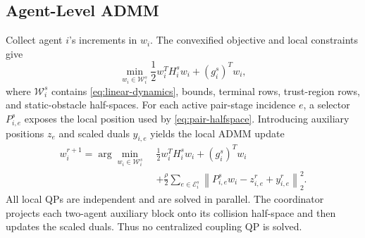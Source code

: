 \documentclass[letterpaper,10pt,conference]{ieeeconf}
\newcommand{\norm}[1]{\left\lVert #1\right\rVert}
\begin{document}
\subsection{Agent-Level ADMM}
Collect agent $i$'s increments in $w_i$. The convexified objective and local
constraints give
\begin{equation}
 \min_{w_i\in\mathcal W_i^s}\frac{1}{2}w_i^T H_i^s w_i
 +(g_i^s)^T w_i,
\end{equation}
where $\mathcal W_i^s$ contains \eqref{eq:linear-dynamics}, bounds, terminal
rows, trust-region rows, and static-obstacle half-spaces. For each active
pair-stage incidence $e$, a selector $P_{i,e}^s$ exposes the local position
used by \eqref{eq:pair-halfspace}. Introducing auxiliary positions $z_e$ and
scaled duals $y_{i,e}$ yields the local ADMM update
\begin{equation}
 \begin{aligned}
 w_i^{r+1}=\arg\min_{w_i\in\mathcal W_i^s}\;&
 \frac{1}{2}w_i^T H_i^s w_i+(g_i^s)^T w_i\\
 &+\frac{\rho}{2}\sum_{e\in\mathcal E_i^s}
 \norm{P_{i,e}^s w_i-z_{i,e}^r+y_{i,e}^r}_2^2.
 \end{aligned}
\label{eq:local-qp}
\end{equation}
All local QPs are independent and are solved in parallel. The coordinator
projects each two-agent auxiliary block onto its collision half-space and then
updates the scaled duals. Thus no centralized coupling QP is solved.
\end{document}
